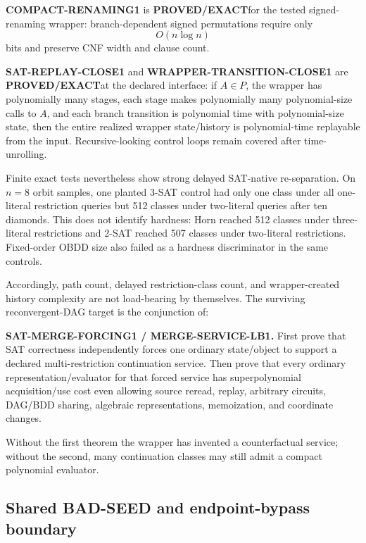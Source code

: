 \documentclass[11pt]{article}
\newcommand{\statusproved}{\textcolor{proved}{\textbf{PROVED/EXACT}}}
\theoremstyle{plain}
\theoremstyle{definition}
\theoremstyle{remark}
\begin{document}
\textbf{COMPACT-RENAMING1} is \statusproved for the tested signed-renaming
wrapper: branch-dependent signed permutations require only
\[
O(n\log n)
\]
bits and preserve CNF width and clause count.

\textbf{SAT-REPLAY-CLOSE1} and \textbf{WRAPPER-TRANSITION-CLOSE1} are
\statusproved at the declared interface: if \(A\in P\), the wrapper has
polynomially many stages, each stage makes polynomially many polynomial-size
calls to \(A\), and each branch transition is polynomial time with
polynomial-size state, then the entire realized wrapper state/history is
polynomial-time replayable from the input.  Recursive-looking control loops
remain covered after time-unrolling.

Finite exact tests nevertheless show strong delayed SAT-native
re-separation.  On \(n=8\) orbit samples, one planted 3-SAT control had only
one class under all one-literal restriction queries but 512 classes under
two-literal queries after ten diamonds.  This does not identify hardness:
Horn reached 512 classes under three-literal restrictions and 2-SAT reached
507 classes under two-literal restrictions.  Fixed-order OBDD size also
failed as a hardness discriminator in the same controls.

Accordingly, path count, delayed restriction-class count, and wrapper-created
history complexity are not load-bearing by themselves.  The surviving
reconvergent-DAG target is the conjunction of:

\begin{candidatebox}
\textbf{SAT-MERGE-FORCING1 / MERGE-SERVICE-LB1.}
First prove that SAT correctness independently forces one ordinary
state/object to support a declared multi-restriction continuation service.
Then prove that every ordinary representation/evaluator for that forced
service has superpolynomial acquisition/use cost even allowing source reread,
replay, arbitrary circuits, DAG/BDD sharing, algebraic representations,
memoization, and coordinate changes.
\end{candidatebox}

Without the first theorem the wrapper has invented a counterfactual service;
without the second, many continuation classes may still admit a compact
polynomial evaluator.


\subsection{Shared BAD-SEED and endpoint-bypass boundary}
\end{document}
